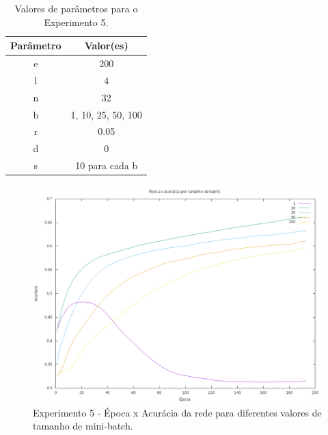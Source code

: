 \documentclass[12pt]{article}
\begin{document}
\begin{table}[h]
	\centering
	\begin{tabular}{|c|c|}
		\hline
		\textbf{Parâmetro} & \textbf{Valor(es)} \\ \hline
		e & 200 \\ \hline
		l & 4 \\ \hline
		n & 32 \\ \hline
		b & {1, 10, 25, 50, 100} \\ \hline
		r & 0.05 \\ \hline
		d & 0 \\ \hline
		s & 10 para cada b \\ \hline
	\end{tabular}
	\caption{\label{tab:exp5} Valores de parâmetros para o Experimento
	5.}
\end{table}

\begin{figure}[h]
  \centering
  \includegraphics[width=1\textwidth]{../tests/5-batch/graph1.png}
  \caption{Experimento 5 - Época x Acurácia da rede para diferentes
  valores de tamanho de mini-batch.}
  \label{fig:exp51}
\end{figure}
\end{document}
